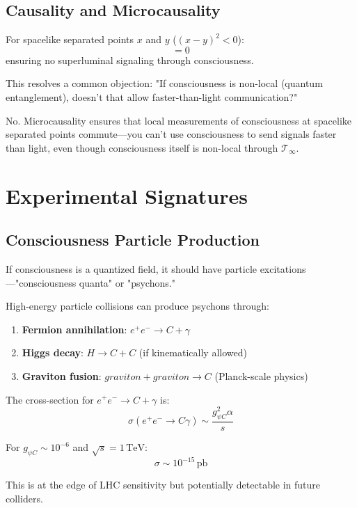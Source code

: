 \subsection{Causality and Microcausality}

\begin{thm}\label{thm:microcausality}
For spacelike separated points $x$ and $y$ ($( x - y)^2 < 0$):
\begin{equation}
[C^{\mu\nu}(x), C^{\rho\sigma}(y)] = 0
\end{equation}
ensuring no superluminal signaling through consciousness\cite{peskin1995,weinberg1995}.
\end{thm}

This resolves a common objection: "If consciousness is non-local (quantum entanglement), doesn't that allow faster-than-light communication?"

No. Microcausality ensures that local measurements of consciousness at spacelike separated points commute—you can't use consciousness to send signals faster than light, even though consciousness itself is non-local through $\mathcal{T}_\infty$.

\section{Experimental Signatures}

\subsection{Consciousness Particle Production}

If consciousness is a quantized field, it should have particle excitations—"consciousness quanta" or "psychons."

\begin{proposition}\label{prop:psychon-production}
High-energy particle collisions can produce psychons through:
\begin{enumerate}
\item \textbf{Fermion annihilation}: $e^+ e^- \to C + \gamma$
\item \textbf{Higgs decay}: $H \to C + C$ (if kinematically allowed)\cite{atlas2012,cms2012}
\item \textbf{Graviton fusion}: $graviton + graviton \to C$ (Planck-scale physics)
\end{enumerate}

The cross-section for $e^+e^- \to C + \gamma$ is:
\begin{equation}
\sigma(e^+e^- \to C\gamma) \sim \frac{g_{\psi C}^2 \alpha}{s}
\end{equation}

For $g_{\psi C} \sim 10^{-6}$ and $\sqrt{s} = 1 \, \text{TeV}$:
\begin{equation}
\sigma \sim 10^{-15} \, \text{pb}
\end{equation}

This is at the edge of LHC sensitivity\cite{atlas2012,cms2012,aad2015} but potentially detectable in future colliders.
\end{proposition}

